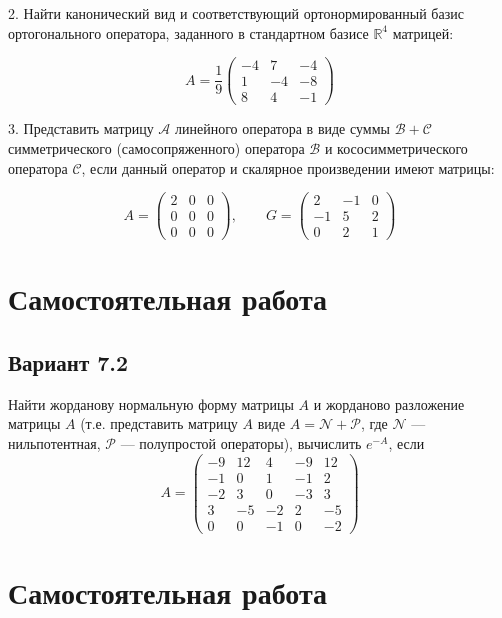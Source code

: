 \documentclass[a4paper]{article}
\newcommand{\No}{\textnumero}
\begin{document}
2. Найти канонический вид и соответствующий ортонормированный
базис ортогонального оператора, заданного в стандартном базисе
$\mathbb{R}^4$ матрицей:

$$ A= \frac{1}{9}\left(
\begin{array}{rrr}
-4 & 7 & -4 \\
1 & -4 & -8 \\
8 & 4 & -1
\end{array} \right)  $$

3. Представить матрицу $\mathcal{A}$ линейного оператора в виде
суммы $\mathcal{B+C}$ симметрического (самосопряженного) оператора
$\mathcal{B}$ и кососимметрического оператора $\mathcal{C}$, если
данный оператор и скалярное произведении имеют матрицы:

$$ A= \left(
\begin{array}{rrr}
2 & 0 & 0 \\
0 & 0 & 0  \\
0 & 0 & 0
\end{array} \right)  ,\qquad G=
\left(
\begin{array}{rrr}
2& -1 & 0\\
-1 & 5 & 2 \\
0 & 2 & 1
\end{array} \right)  $$

\section{Самостоятельная работа \No 1}

\subsection{Вариант 7.2}

Найти жорданову нормальную форму матрицы $A$ и жорданово
разложение матрицы $A$ (т.е. представить матрицу $A$ виде
$A=\mathcal{N} + \mathcal{P}$, где $\mathcal{N}$
--- нильпотентная, $\mathcal{P}$ --- полупростой операторы),
вычислить $e^{-A}$, если
$$
A= \left(
\begin{array}{rrrrr}
-9 & 12 & 4 & -9 & 12 \\
-1 & 0 & 1 & -1 & 2 \\
-2 & 3 & 0 & -3 & 3 \\
3  & -5&-2 &  2 & -5 \\
0 & 0&  -1 & 0  &-2
\end{array} \right)
$$


\section{Самостоятельная работа \No 2}
\end{document}
